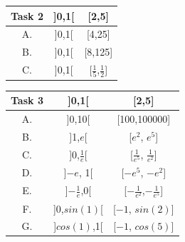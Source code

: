 \documentclass[12pt]{article}
\begin{document}
\begin{center}
	\begin{tabular}{| c c c |}
	\hline
		Task 2 & ]0,1[ & [2,5]\\
	\hline\hline
		A. & ]0,1[ & [4,25]\\
	\hline
		B. & ]0,1[ & [8,125]\\
	\hline 
		C. & ]0,1[ & [$\frac{1}{5}$,$\frac{1}{2}$]\\
	\hline
	\end{tabular}
\end{center}


\begin{center}
	\begin{tabular}{| c c c |}
	\hline
		Task 3 & ]0,1[ & [2,5]\\
	\hline\hline
		A. & ]0,10[ & [100,100000]\\
	\hline
		B. & ]1,$e$[ & [$e^2$, $e^5$]\\
	\hline 
		C. & ]0,$\frac{1}{e}$[ & [$\frac{1}{e^5}$, $\frac{1}{e^2}$]\\
	\hline
		D. & ]$-e$, 1[ & [$-e^5$, $-e^2$]\\
	\hline
		E. & ]$-\frac{1}{e}$,0[ & [$-\frac{1}{e^2}$,$-\frac{1}{e^5}$]\\
	\hline
		F. & ]0,$sin(1)$[ & [$-1$, $sin(2)$]\\
	\hline
		G. & ]$cos(1)$,1[ & [$-1$, $cos(5)$]\\
	\hline
	\end{tabular}
\end{center}
\end{document}
